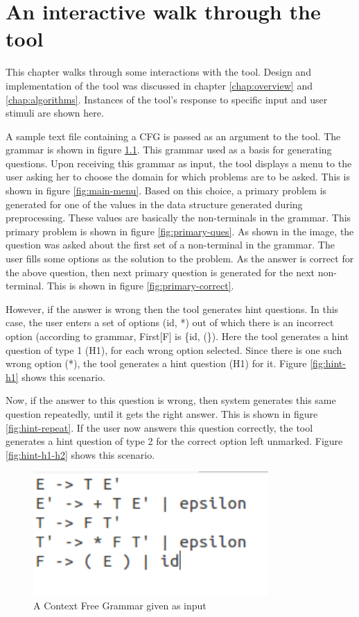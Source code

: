 \chapter{An interactive walk through the tool}
\label{interactions}

This chapter walks through some interactions with the tool. Design and implementation of the tool was discussed in chapter \ref{chap:overview} and \ref{chap:algorithms}. Instances of the tool's response to specific input and user stimuli are shown here.

A sample text file containing a CFG is passed as an argument to the tool. The grammar is shown in figure \ref{fig:grammar}. This grammar used as a basis for generating questions. Upon receiving this grammar as input, the tool displays a menu to the user asking her to choose the domain for which problems are to be asked. This is shown in figure \ref{fig:main-menu}. Based on this choice, a primary problem is generated for one of the values in the data structure generated during preprocessing. These values are basically the non-terminals in the grammar. This primary problem is shown in figure \ref{fig:primary-ques}. As shown in the image, the question was asked about the first set of a non-terminal in the grammar. The user fills some options as the solution to the problem. As the answer is correct for the above question, then next primary question is generated for the next non-terminal. This is shown in figure \ref{fig:primary-correct}.

However, if the answer is wrong then the tool generates hint questions. In this case, the user enters a set of options (id, *) out of which there is an incorrect option (according to grammar, First[F] is \{id, (\}). Here the tool generates a hint question of type 1 (H1), for each wrong option selected. Since there is one such wrong option (*), the tool generates a hint question (H1) for it. Figure \ref{fig:hint-h1} shows this scenario. 

Now, if the answer to this question is wrong, then system generates this same question repeatedly, until it gets the right answer. This is shown in figure \ref{fig:hint-repeat}. If the user now answers this question correctly, the tool generates a hint question of type 2 for the correct option left unmarked. Figure \ref{fig:hint-h1-h2} shows this scenario.

\begin{figure}
\centering
\includegraphics[width=0.8\textwidth]{grammar.png}
\caption{A Context Free Grammar given as input}
\label{fig:grammar}
\end{figure}

